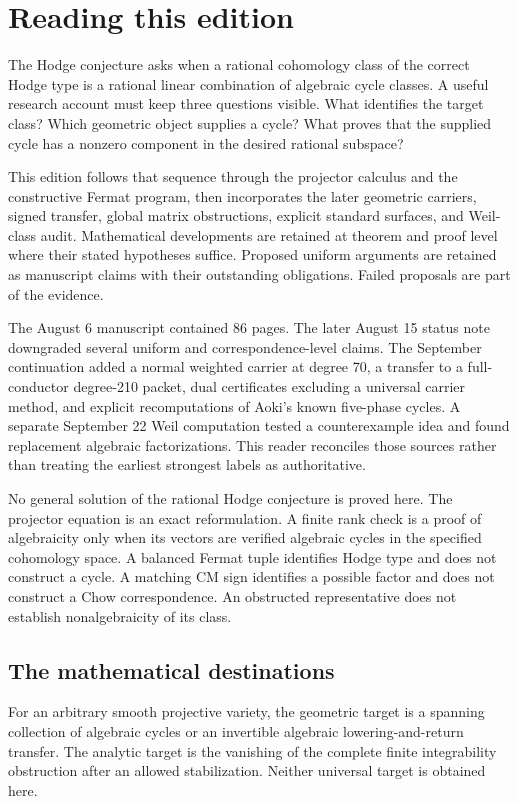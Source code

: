 \chapter*{Reading this edition}
The Hodge conjecture asks when a rational cohomology class of the correct Hodge type is a rational linear combination of algebraic cycle classes. A useful research account must keep three questions visible. What identifies the target class? Which geometric object supplies a cycle? What proves that the supplied cycle has a nonzero component in the desired rational subspace?

This edition follows that sequence through the projector calculus and the constructive Fermat program, then incorporates the later geometric carriers, signed transfer, global matrix obstructions, explicit standard surfaces, and Weil-class audit. Mathematical developments are retained at theorem and proof level where their stated hypotheses suffice. Proposed uniform arguments are retained as manuscript claims with their outstanding obligations. Failed proposals are part of the evidence.

The August 6 manuscript contained 86 pages. The later August 15 status note downgraded several uniform and correspondence-level claims. The September continuation added a normal weighted carrier at degree 70, a transfer to a full-conductor degree-210 packet, dual certificates excluding a universal carrier method, and explicit recomputations of Aoki's known five-phase cycles. A separate September 22 Weil computation tested a counterexample idea and found replacement algebraic factorizations. This reader reconciles those sources rather than treating the earliest strongest labels as authoritative.

\begin{claimboundary}
No general solution of the rational Hodge conjecture is proved here. The projector equation is an exact reformulation. A finite rank check is a proof of algebraicity only when its vectors are verified algebraic cycles in the specified cohomology space. A balanced Fermat tuple identifies Hodge type and does not construct a cycle. A matching CM sign identifies a possible factor and does not construct a Chow correspondence. An obstructed representative does not establish nonalgebraicity of its class.
\end{claimboundary}

\section*{The mathematical destinations}
For an arbitrary smooth projective variety, the geometric target is a spanning collection of algebraic cycles or an invertible algebraic lowering-and-return transfer. The analytic target is the vanishing of the complete finite integrability obstruction after an allowed stabilization. Neither universal target is obtained here.

